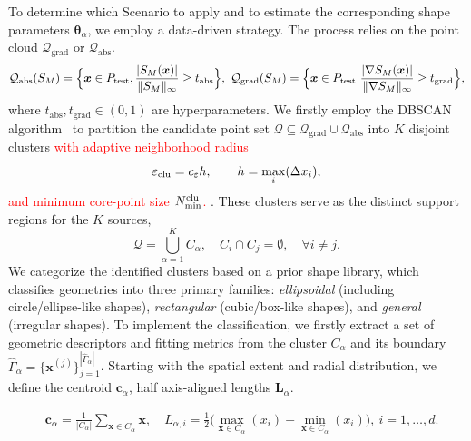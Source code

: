 \documentclass{article}
\newcommand{\red}[1]{\textcolor{red}{#1}}
\theoremstyle{plain}
\theoremstyle{definition}
\begin{document}
To determine which Scenario to apply and to estimate the corresponding shape parameters $\boldsymbol{\theta}_\alpha$, we employ a data-driven strategy. The process relies on the point cloud $\mathcal{Q}_{\text{grad}}$ or $\mathcal{Q}_{\text{abs}}$. 
\begin{align}
 \mathcal{Q}_{\text{abs}}(S_M)=\Bigl\{\boldsymbol{x} \in P_{\text{test}}, \frac{|S_M(\boldsymbol{x})|}{\|S_M\|_\infty} \geq t_{\text{abs}} \Bigr\},
 \ \mathcal{Q}_{\text{grad}}(S_M)=\Bigl\{\boldsymbol{x} \in P_{\text{test}}\  \frac{|\nabla S_M(\boldsymbol{x})|}{\|\nabla S_M\|_\infty} \geq t_{\text{grad}}\Bigr\},
\end{align}
where $t_{\text{abs}}, t_{\text{grad}} \in (0,1)$ are hyperparameters. 
We firstly employ the DBSCAN algorithm~\cite{EsterKX1996DensitybasedAlgorithm} to partition the candidate point set $\mathcal{Q} \subseteq \mathcal{Q}_{\text{grad}} \cup \mathcal{Q}_{\text{abs}}$ into $K$ disjoint clusters \red{with adaptive neighborhood radius
  \[
  \varepsilon_{\rm clu}=c_\varepsilon h,\qquad
  h=\max_i(\Delta x_i),
  \]
  and minimum core-point size $N_{\min}^{\rm clu}$.}
. These clusters serve as the distinct support regions for the $K$ sources,
$$\mathcal{Q}=\bigcup_{\alpha=1}^{K} C_\alpha, \quad C_i\cap C_j=\emptyset, \quad \forall i \neq j.$$
We categorize the identified clusters based on a prior shape library, which classifies geometries into three primary families: \emph{ellipsoidal} (including circle/ellipse-like shapes), \emph{rectangular} (cubic/box-like shapes), and \emph{general} (irregular shapes). To implement the classification, we firstly extract a set of geometric descriptors and fitting metrics from the cluster $C_\alpha$ and its boundary $\hat{\Gamma}_\alpha = \{\boldsymbol{x}^{(j)}\}_{j=1}^{|\hat{\Gamma}_\alpha|}$. Starting with the spatial extent and radial distribution, we define the centroid $\boldsymbol{c}_\alpha$, half axis-aligned lengths $\boldsymbol{L}_\alpha$.

\begin{equation}
\label{eq: geometric_basic}
\begin{aligned}
    & \boldsymbol{c}_\alpha = \frac{1}{|C_\alpha|}\sum_{\boldsymbol{x}\in C_\alpha}\boldsymbol{x}, 
    \quad 
    L_{\alpha,i} = \frac{1}{2} \bigl( \max_{\boldsymbol{x} \in C_\alpha}(x_i) - \min_{\boldsymbol{x} \in C_\alpha}(x_i) \bigr), \ i=1,\dots,d. 
\end{aligned}
\end{equation}
\end{document}
